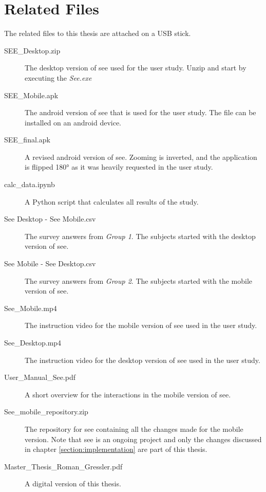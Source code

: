 \section{Related Files}

The related files to this thesis are attached on a USB stick.

\begin{description}
    \item[SEE\_Desktop.zip] \label{file:desktop} The desktop version of \gls{see} used for the user study. Unzip and start by executing the \textit{See.exe}
    \item[SEE\_Mobile.apk] The \gls{android} version of \gls{see} that is used for the user study. The file can be installed on an \gls{android} device.
    \item[SEE\_final.apk] A revised \gls{android} version of \gls{see}. Zooming is inverted, and the application is flipped 180° as it was heavily requested in the user study.
    \item[calc\_data.ipynb] \label{calc} A Python script that calculates all results of the study.
    \item[See Desktop - See Mobile.csv] \label{group1} The survey answers from \textit{Group 1}. The subjects started with the desktop version of \gls{see}.
    \item[See Mobile - See Desktop.csv] \label{group2} The survey answers from \textit{Group 2}. The subjects started with the mobile version of \gls{see}.
    \item[See\_Mobile.mp4] The instruction video for the mobile version of \gls{see} used in the user study.
    \item[See\_Desktop.mp4] The instruction video for the desktop version of \gls{see} used in the user study.
    \item[User\_Manual\_See.pdf] A short overview for the interactions in the mobile version of \gls{see}.
    \item[See\_mobile\_repository.zip] The repository for \gls{see} containing all the changes made for the mobile version. Note that \gls{see} is an ongoing project and only the changes discussed in chapter \ref{section:implementation} are part of this thesis.
    \item[Master\_Thesis\_Roman\_Gressler.pdf] A digital version of this thesis. 
\end{description}

